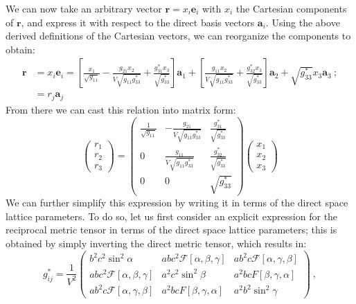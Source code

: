 We can now take an arbitrary vector $\mathbf{r}=x_i\mathbf{e}_i$ with $x_i$ the Cartesian components of $\mathbf{r}$, and express it with respect to the direct basis vectors $\mathbf{a}_i$. Using the above derived definitions of the Cartesian vectors, we can reorganize the components to obtain:
\begin{equation*}
\begin{split}
	\mathbf{r}&=x_i\mathbf{e}_i = \left[\frac{x_1}{ \sqrt{g_{11}} }- \frac{g_{21}x_2}{V\sqrt{g_{11}g^{\ast}_{33}}}+ \frac{g^{\ast}_{31}x_3}{\sqrt{g^{\ast}_{33}}} \right]\mathbf{a}_1+
	\left[ \frac{g_{11}x_2}{V\sqrt{g_{11}g^{\ast}_{33}}}+ \frac{g^{\ast}_{32}x_3}{\sqrt{g^{\ast}_{33}}} \right]\mathbf{a}_2+\sqrt{g^{\ast}_{33}}x_3\mathbf{a}_3\ ;\\
	&= r_j\mathbf{a}_j
\end{split}
\end{equation*}
From there we can cast this relation into matrix form:
\begin{equation}
	\begin{pmatrix}r_1\\ r_2\\ r_3\end{pmatrix} = \begin{pmatrix} \frac{1}{ \sqrt{g_{11}} } & - \frac{g_{21}}{V\sqrt{g_{11}g^{\ast}_{33}}}& \frac{g^{\ast}_{31}}{\sqrt{g^{\ast}_{33}}} \\
	0 & \frac{g_{11}}{V\sqrt{g_{11}g^{\ast}_{33}}}& \frac{g^{\ast}_{32}}{\sqrt{g^{\ast}_{33}}}  \\
	0&0&\sqrt{g^{\ast}_{33}}\end{pmatrix}\begin{pmatrix}x_1\\ x_2\\ x_3\end{pmatrix}
\end{equation}
We can further simplify this expression by writing it in terms of the direct space lattice parameters. To do so, let us first consider an explicit expression for the reciprocal metric tensor in terms of the direct space lattice parameters; this is obtained by simply inverting the direct metric tensor, which results in:
\[
	g^{\ast}_{ij} = \frac{1}{V^2}\begin{pmatrix}b^2c^2\sin^2\alpha & a b c^2\mathcal{F}[\alpha,\beta,\gamma]&a b^2 c \mathcal{F}[\alpha,\gamma,\beta]\\
	a b c^2\mathcal{F}[\alpha,\beta,\gamma] & a^2c^2\sin^2\beta & a^2bcF[\beta,\gamma,\alpha]\\
	a b^2 c \mathcal{F}[\alpha,\gamma,\beta] & a^2bcF[\beta,\gamma,\alpha] &a^2b^2\sin^2\gamma\end{pmatrix}\ ,
\]
